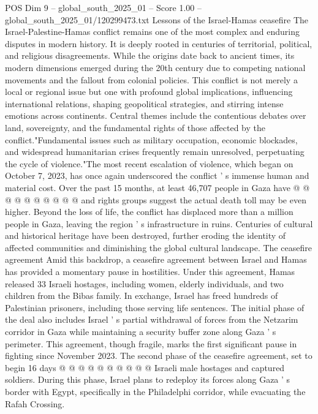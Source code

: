 \begin{textsample}{POS Dim 9 – global\_south\_2025\_01 – Score 1.00 – global\_south\_2025\_01/120299473.txt}  \label{ex:f9_pos_307}
Lessons of the Israel-Hamas ceasefire The Israel-Palestine-Hamas conflict remains one of the most complex and enduring disputes in modern history.
It is deeply rooted in centuries of territorial, political, and religious disagreements.
While the origins date back to ancient times, its modern dimensions emerged during the 20th century due to competing national movements and the fallout from colonial policies.
This conflict is not merely a local or regional issue but one with profound global implications, influencing international relations, shaping geopolitical strategies, and stirring intense emotions across continents.
Central themes include the contentious debates over land, sovereignty, and the fundamental rights of those affected by the conflict."Fundamental issues such as military occupation, economic blockades, and widespread humanitarian crises frequently remain unresolved, perpetuating the cycle of violence."The most recent escalation of violence, which began on October 7, 2023, has once again underscored the conflict ' s immense human and material cost.
Over the past 15 months, at least 46,707 people in Gaza have @ @ @ @ @ @ @ @ @ @ and rights groups suggest the actual death toll may be even higher.
Beyond the loss of life, the conflict has displaced more than a million people in Gaza, leaving the region ' s infrastructure in ruins.
Centuries of cultural and historical heritage have been destroyed, further eroding the identity of affected communities and diminishing the global cultural landscape.
The ceasefire agreement Amid this backdrop, a ceasefire agreement between Israel and Hamas has provided a momentary pause in hostilities.
Under this agreement, Hamas released 33 Israeli hostages, including women, elderly individuals, and two children from the Bibas family.
In exchange, Israel has freed hundreds of Palestinian prisoners, including those serving life sentences.
The initial phase of the deal also includes Israel ' s partial withdrawal of forces from the Netzarim corridor in Gaza while maintaining a security buffer zone along Gaza ' s perimeter.
This agreement, though fragile, marks the first significant pause in fighting since November 2023.
The second phase of the ceasefire agreement, set to begin 16 days @ @ @ @ @ @ @ @ @ @ Israeli male hostages and captured soldiers.
During this phase, Israel plans to redeploy its forces along Gaza ' s border with Egypt, specifically in the Philadelphi corridor, while evacuating the Rafah Crossing.

\end{textsample}
